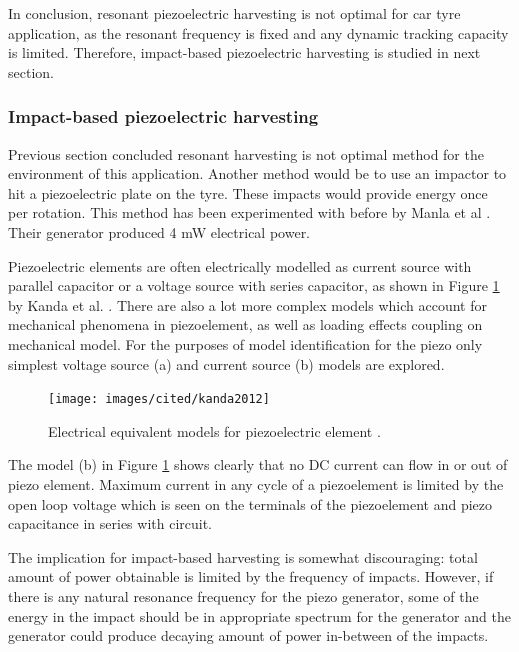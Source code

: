 In conclusion, resonant piezoelectric harvesting is not optimal for car tyre application, as the resonant frequency is fixed and any dynamic tracking capacity is limited. Therefore, impact-based piezoelectric harvesting is studied in next section.

\subsubsection{Impact-based piezoelectric harvesting}
Previous section concluded resonant harvesting is not optimal method for the environment of this application. Another method would be to use an impactor to hit a piezoelectric plate on the tyre. These impacts would provide energy once per rotation. This method has been experimented with before by Manla et al \cite{Manla2009}. Their generator produced 4 mW electrical power.

Piezoelectric elements are often electrically modelled as current source with parallel capacitor or a voltage source with series capacitor, as shown in Figure \ref{fig:piezo_equivalents} by Kanda et al. \cite{Kanda2012}. There are also a lot more complex models which account for mechanical phenomena in piezoelement, as well as loading effects coupling on mechanical model. For the purposes of model identification for the piezo only simplest voltage source (a) and current source (b) models are explored.

\begin{figure}[htb]
  \begin{center}
  \texttt{[image: images/cited/kanda2012]}
  \end{center}
  \caption{Electrical equivalent models for piezoelectric element \cite{Kanda2012}.}
  \label{fig:piezo_equivalents}
\end{figure}

The model (b) in Figure \ref{fig:piezo_equivalents} shows clearly that no DC current can flow in or out of piezo element. Maximum current in any cycle of a piezoelement is limited by the open loop voltage which is seen on the terminals of the piezoelement and piezo capacitance in series with circuit. 

The implication for impact-based harvesting is somewhat discouraging: total amount of power obtainable is limited by the frequency of impacts. However, if there is any natural resonance frequency for the piezo generator, some of the energy in the impact should be in appropriate spectrum for the generator and the generator could produce decaying amount of power in-between of the impacts.

